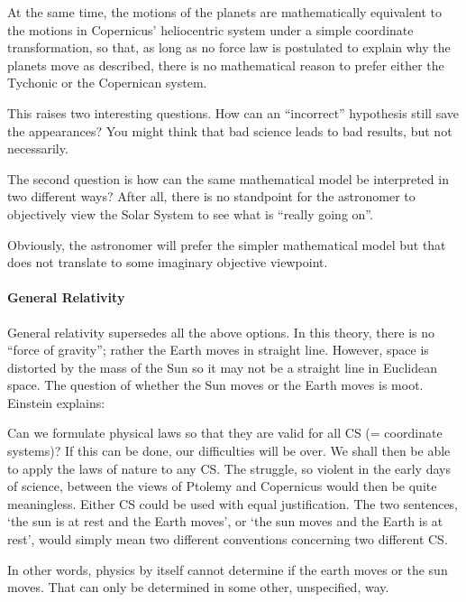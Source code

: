 \begin{quotex}
At the same time, the motions of the planets are mathematically equivalent to the motions in Copernicus' heliocentric system under a simple coordinate transformation, so that, as long as no force law is postulated to explain why the planets move as described, there is no mathematical reason to prefer either the Tychonic or the Copernican system.
\end{quotex}


This raises two interesting questions. How can an ``incorrect'' hypothesis still save the appearances? You might think that bad science leads to bad results, but not necessarily.

The second question is how can the same mathematical model be interpreted in two different ways? After all, there is no standpoint for the astronomer to objectively view the Solar System to see what is ``really going on''.

Obviously, the astronomer will prefer the simpler mathematical model but that does not translate to some imaginary objective viewpoint.

\paragraph{General Relativity}


General relativity supersedes all the above options. In this theory, there is no ``force of gravity''; rather the Earth moves in straight line. However, space is distorted by the mass of the Sun so it may not be a straight line in Euclidean space. The question of whether the Sun moves or the Earth moves is moot. Einstein explains:

\begin{quotex}
Can we formulate physical laws so that they are valid for all CS (= coordinate systems)? If this can be done, our difficulties will be over. We shall then be able to apply the laws of nature to any CS. The struggle, so violent in the early days of science, between the views of Ptolemy and Copernicus would then be quite meaningless. Either CS could be used with equal justification. The two sentences, `the sun is at rest and the Earth moves', or `the sun moves and the Earth is at rest', would simply mean two different conventions concerning two different CS.
\end{quotex}


In other words, physics by itself cannot determine if the earth moves or the sun moves. That can only be determined in some other, unspecified, way.

